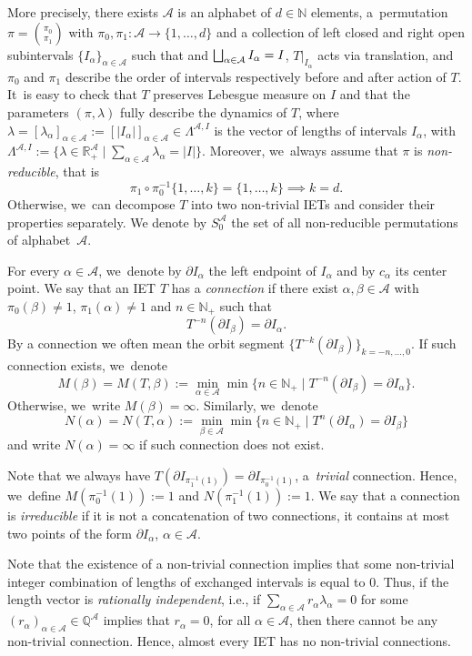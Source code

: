 \documentclass[10pt,a4paper]{amsart}
\let\oldbigsqcup\bigsqcup
\renewcommand{\bigsqcup}{\mathop{\textstyle\oldbigsqcup}\displaylimits}
\theoremstyle{plain}
\theoremstyle{definition}
\newcommand{\A}{\mathcal{A}}
\newcommand{\N}{\mathbb{N}}
\newcommand{\R}{\mathbb{R}}
\begin{document}
More precisely, there exists $\A$ is an alphabet of $d\in\N$ elements, a~permutation $\pi=\binom{\pi_0}{\pi_1}$ with $\pi_0,\pi_1:\mathcal A\to\{1,\ldots,d\}$ and a collection of left closed and right open subintervals $\{I_{\alpha}\}_{\alpha\in\mathcal A}$ such that and $\bigsqcup_{\alpha\in\A} I_{\alpha}=I$, $T|_{I_{\alpha}}$ acts via translation, and $\pi_0$ and $\pi_1$ describe the order of intervals respectively before and after
action of $T$. It~is easy to check that $T$ preserves Lebesgue measure on $I$ and that the parameters $(\pi,\lambda)$ fully describe the dynamics of $T$, where $\lambda=[\lambda_\alpha]_{\alpha\in\A}:=[|I_{\alpha}|]_{\alpha\in\A}\in \Lambda^{\mathcal A,I}$ is the vector of lengths of intervals $I_{\alpha}$, with $\Lambda^{\mathcal A,I}:=\{\lambda\in\R^{\A}_{+}\mid \sum_{\alpha\in\A}\lambda_{\alpha}=|I|\}$. {Moreover, we~always assume that $\pi$ is \emph{non-reducible}, that is
\[
\pi_1\circ\pi^{-1}_0\{1,\ldots,k\}=\{1,\ldots,k\}\implies k=d.
\]
Otherwise, we~can decompose $T$ into two non-trivial IETs and consider their properties separately. We denote by $S_0^{\A}$ the set of all non-reducible permutations of alphabet~$\A$.
}

For every $\alpha\in\A$, we~denote by $\partial I_{\alpha}$ the left endpoint of $I_{\alpha}$ and by $c_{\alpha}$ its center point. We say that an IET $T$ has a \emph{connection} if there exist $\alpha,\beta\in\A$ with $\pi_0(\beta)\neq 1$, $\pi_1(\alpha)\neq 1$ and $n\in\N_+$ such that
\[
T^{-n}(\partial I_\beta)=\partial I_{\alpha}.
\]
By a connection we often mean the orbit segment $\{T^{-k}(\partial I_\beta)\}_{k=-n,\ldots,0}$.
If such connection exists, we~denote
\[
M(\beta)=M(T,\beta):=\min_{\alpha\in\A}\min\{n\in\N_+\mid T^{-n}(\partial I_\beta)=\partial I_{\alpha}\}.
\]
Otherwise, we~write $M(\beta)=\infty$. Similarly, we~denote
\[
N(\alpha)=N(T,\alpha):=\min_{\beta\in\A}\min\{n\in\N_+\mid T^{n}(\partial I_\alpha)=\partial I_{\beta}\}
\]
and write $N(\alpha)=\infty$ if such connection does not exist. {Note that we always have $T(\partial I_{\pi_1^{-1}(1)})=\partial I_{\pi_0^{-1}(1)}$, a~\emph{trivial} connection. Hence, we~define $M(\pi_0^{-1}(1)):=1$ and $N(\pi_1^{-1}(1)):=1$. {We say that a connection is \emph{irreducible} if it is not a concatenation of two connections, \ie it contains at most two points of the form $\partial I_{\alpha}$, $\alpha\in\A$}.

}

Note that the existence of a non-trivial connection implies that some
non-trivial integer combination of lengths of exchanged intervals is equal to
$0$. Thus, if the length vector is \emph{rationally independent}, i.e., if
$\sum_{\alpha\in\A}r_{\alpha}\lambda_\alpha=0$ for some $(r_{\alpha})_{\alpha
\in \A} \in\mathbb Q^{\A}$ implies that $r_{\alpha}=0$, for all $\alpha\in\A$,
then there cannot be any non-trivial connection. Hence, almost every IET has no non-trivial
connections.
\end{document}
